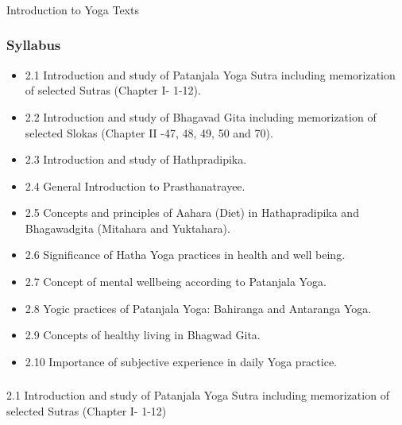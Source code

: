 \begin{frame}[fragile]\frametitle{}
\begin{center}
{\Large Introduction to Yoga Texts }
\end{center}
\end{frame}

\begin{frame}[fragile]\frametitle{Syllabus}

\begin{itemize}
\item 2.1  Introduction  and  study  of  Patanjala  Yoga  Sutra  including  memorization  of  selected Sutras (Chapter I- 1-12). 
\item 2.2  Introduction  and  study  of  Bhagavad  Gita  including  memorization  of  selected  Slokas (Chapter II -47, 48, 49, 50 and 70). 
\item 2.3  Introduction and study of Hathpradipika.  
\item 2.4  General Introduction to Prasthanatrayee. 
\item 2.5  Concepts  and  principles  of  Aahara  (Diet)  in  Hathapradipika  and  Bhagawadgita  (Mitahara and Yuktahara). 
\item 2.6  Significance of Hatha Yoga practices in health and well being. 
\item 2.7  Concept of mental wellbeing according to Patanjala Yoga. 
\item 2.8  Yogic practices of Patanjala Yoga: Bahiranga and Antaranga Yoga. 
\item 2.9  Concepts of healthy living in Bhagwad Gita. 
\item 2.10  Importance of subjective experience in daily Yoga practice. 
\end{itemize}
	  
\end{frame}

\begin{frame}[fragile]\frametitle{}
\begin{center}
{\Large 2.1  Introduction  and  study  of  Patanjala  Yoga  Sutra  including  memorization  of  selected Sutras (Chapter I- 1-12)}
\end{center}
\end{frame}

